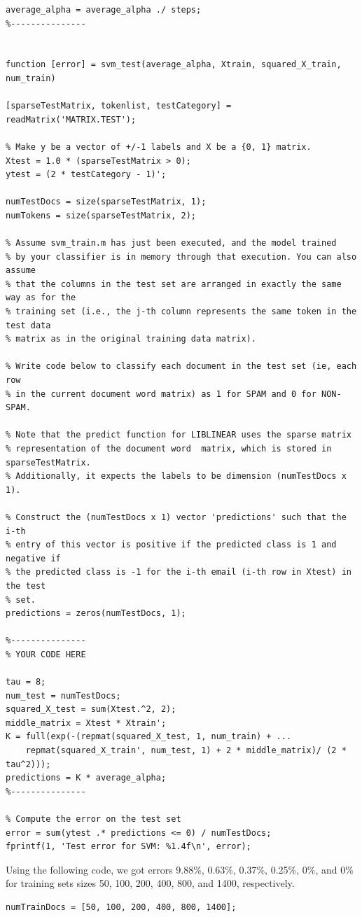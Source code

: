 \documentclass[11pt,a4paper,titlepage]{article}
\begin{document}
{{\begin{verbatim}
average_alpha = average_alpha ./ steps;
%---------------


function [error] = svm_test(average_alpha, Xtrain, squared_X_train, num_train)

[sparseTestMatrix, tokenlist, testCategory] = readMatrix('MATRIX.TEST');

% Make y be a vector of +/-1 labels and X be a {0, 1} matrix.
Xtest = 1.0 * (sparseTestMatrix > 0);
ytest = (2 * testCategory - 1)';

numTestDocs = size(sparseTestMatrix, 1);
numTokens = size(sparseTestMatrix, 2);

% Assume svm_train.m has just been executed, and the model trained
% by your classifier is in memory through that execution. You can also assume 
% that the columns in the test set are arranged in exactly the same way as for the
% training set (i.e., the j-th column represents the same token in the test data 
% matrix as in the original training data matrix).

% Write code below to classify each document in the test set (ie, each row
% in the current document word matrix) as 1 for SPAM and 0 for NON-SPAM.

% Note that the predict function for LIBLINEAR uses the sparse matrix 
% representation of the document word  matrix, which is stored in sparseTestMatrix.
% Additionally, it expects the labels to be dimension (numTestDocs x 1).

% Construct the (numTestDocs x 1) vector 'predictions' such that the i-th
% entry of this vector is positive if the predicted class is 1 and negative if
% the predicted class is -1 for the i-th email (i-th row in Xtest) in the test
% set.
predictions = zeros(numTestDocs, 1);

%---------------
% YOUR CODE HERE

tau = 8;
num_test = numTestDocs;
squared_X_test = sum(Xtest.^2, 2);
middle_matrix = Xtest * Xtrain';
K = full(exp(-(repmat(squared_X_test, 1, num_train) + ...
    repmat(squared_X_train', num_test, 1) + 2 * middle_matrix)/ (2 * tau^2)));
predictions = K * average_alpha;
%---------------

% Compute the error on the test set
error = sum(ytest .* predictions <= 0) / numTestDocs;
fprintf(1, 'Test error for SVM: %1.4f\n', error);
\end{verbatim}
\quad Using the following code, we got errors 9.88\%, 0.63\%, 0.37\%, 0.25\%, 0\%, and 0\% for training sets sizes 50, 100, 200, 400, 800, and 1400, respectively.
\begin{verbatim}
numTrainDocs = [50, 100, 200, 400, 800, 1400];


\end{verbatim}}}
\end{document}
